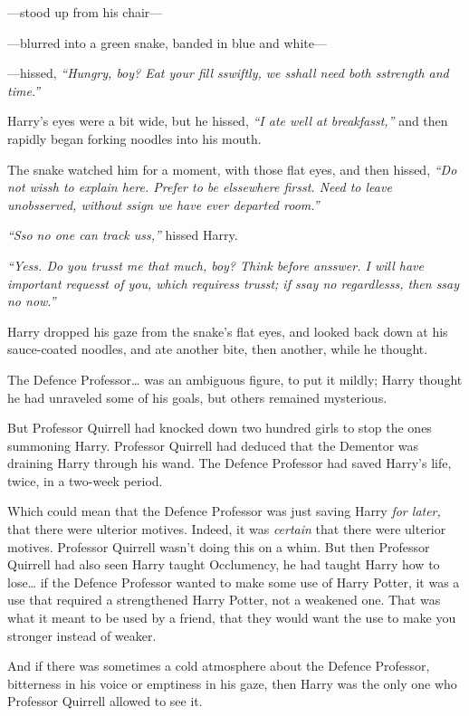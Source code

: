 ---stood up from his chair---

---blurred into a green snake, banded in blue and white---

---hissed, \emph{``Hungry, boy? Eat your fill sswiftly, we sshall need
both sstrength and time.''}

Harry's eyes were a bit wide, but he hissed, \emph{``I ate well at
breakfasst,''} and then rapidly began forking noodles into his mouth.

The snake watched him for a moment, with those flat eyes, and then
hissed, \emph{``Do not wissh to explain here. Prefer to be elssewhere
firsst. Need to leave unobsserved, without ssign we have ever departed
room.''}

\emph{``Sso no one can track uss,''} hissed Harry.

\emph{``Yess. Do you trusst me that much, boy? Think before ansswer. I
will have important requesst of you, which requiress trusst; if ssay no
regardlesss, then ssay no now.''}

Harry dropped his gaze from the snake's flat eyes, and looked back down
at his sauce-coated noodles, and ate another bite, then another, while
he thought.

The Defence Professor\ldots{} was an ambiguous figure, to put it mildly;
Harry thought he had unraveled some of his goals, but others remained
mysterious.

But Professor Quirrell had knocked down two hundred girls to stop the
ones summoning Harry. Professor Quirrell had deduced that the Dementor
was draining Harry through his wand. The Defence Professor had saved
Harry's life, twice, in a two-week period.

Which could mean that the Defence Professor was just saving Harry
\emph{for later,} that there were ulterior motives. Indeed, it was
\emph{certain} that there were ulterior motives. Professor Quirrell
wasn't doing this on a whim. But then Professor Quirrell had also seen
Harry taught Occlumency, he had taught Harry how to lose\ldots{} if the
Defence Professor wanted to make some use of Harry Potter, it was a use
that required a strengthened Harry Potter, not a weakened one. That was
what it meant to be used by a friend, that they would want the use to
make you stronger instead of weaker.

And if there was sometimes a cold atmosphere about the Defence
Professor, bitterness in his voice or emptiness in his gaze, then Harry
was the only one who Professor Quirrell allowed to see it.

